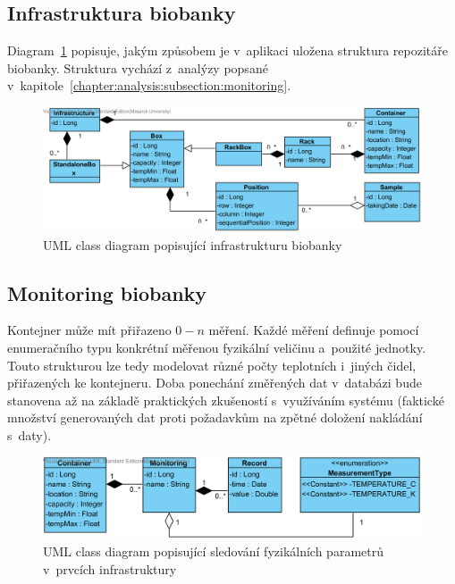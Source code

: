 \documentclass[11pt, draft, oneside]{fithesis2}
\begin{document}
\subsection{Infrastruktura biobanky}
Diagram~\ref{fig:index:uml:class:infrastructure} popisuje, jakým způsobem je v~aplikaci uložena struktura repozitáře biobanky. Struktura vychází z~analýzy popsané v~kapitole~\ref{chapter:analysis:subsection:monitoring}.

\begin{figure}[h!]
\begin{center}
	\includegraphics[width=\textwidth]{InfrastructureView}
\caption{UML class diagram popisující infrastrukturu biobanky}
\label{fig:index:uml:class:infrastructure}
\end{center}
\end{figure}

\subsection{Monitoring biobanky}
Kontejner může mít přiřazeno $0-n$ měření. Každé měření definuje pomocí enumeračního typu konkrétní měřenou fyzikální veličinu a~použité jednotky. Touto strukturou lze tedy modelovat různé počty teplotních i~jiných čidel, přiřazených ke kontejneru. 
Doba ponechání změřených dat v~databázi bude stanovena až na základě praktických zkušeností s~využíváním systému (faktické množství generovaných dat proti požadavkům na zpětné doložení nakládání s~daty).

\begin{figure}[h!]
\begin{center}
	\includegraphics[width=\textwidth]{MonitoringView}
\caption{UML class diagram popisující sledování fyzikálních parametrů v~prvcích infrastruktury}
\label{fig:index:uml:class:monitoring}
\end{center}
\end{figure}
\end{document}
